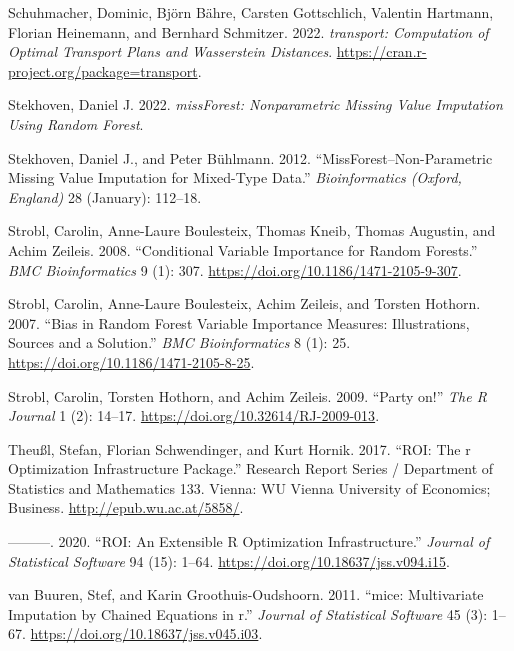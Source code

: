 \begin{CSLReferences}{1}{0}
\leavevmode{}%
Schuhmacher, Dominic, Björn Bähre, Carsten Gottschlich, Valentin Hartmann, Florian Heinemann, and Bernhard Schmitzer. 2022. \emph{{transport}: Computation of Optimal Transport Plans and Wasserstein Distances}. \url{https://cran.r-project.org/package=transport}.

\leavevmode{}%
Stekhoven, Daniel J. 2022. \emph{missForest: Nonparametric Missing Value Imputation Using Random Forest}.

\leavevmode{}%
Stekhoven, Daniel J., and Peter Bühlmann. 2012. {``MissForest--Non-Parametric Missing Value Imputation for Mixed-Type Data.''} \emph{Bioinformatics (Oxford, England)} 28 (January): 112--18.

\leavevmode{}%
Strobl, Carolin, Anne-Laure Boulesteix, Thomas Kneib, Thomas Augustin, and Achim Zeileis. 2008. {``Conditional Variable Importance for Random Forests.''} \emph{BMC Bioinformatics} 9 (1): 307. \url{https://doi.org/10.1186/1471-2105-9-307}.

\leavevmode{}%
Strobl, Carolin, Anne-Laure Boulesteix, Achim Zeileis, and Torsten Hothorn. 2007. {``Bias in Random Forest Variable Importance Measures: Illustrations, Sources and a Solution.''} \emph{BMC Bioinformatics} 8 (1): 25. \url{https://doi.org/10.1186/1471-2105-8-25}.

\leavevmode{}%
Strobl, Carolin, Torsten Hothorn, and Achim Zeileis. 2009. {``{Party on!}''} \emph{{The R Journal}} 1 (2): 14--17. \url{https://doi.org/10.32614/RJ-2009-013}.

\leavevmode{}%
Theußl, Stefan, Florian Schwendinger, and Kurt Hornik. 2017. {``ROI: The r Optimization Infrastructure Package.''} Research Report Series / Department of Statistics and Mathematics 133. Vienna: WU Vienna University of Economics; Business. \url{http://epub.wu.ac.at/5858/}.

\leavevmode{}%
---------. 2020. {``{ROI}: An Extensible {R} Optimization Infrastructure.''} \emph{Journal of Statistical Software} 94 (15): 1--64. \url{https://doi.org/10.18637/jss.v094.i15}.

\leavevmode{}%
van Buuren, Stef, and Karin Groothuis-Oudshoorn. 2011. {``{mice}: Multivariate Imputation by Chained Equations in r.''} \emph{Journal of Statistical Software} 45 (3): 1--67. \url{https://doi.org/10.18637/jss.v045.i03}.


\end{CSLReferences}

